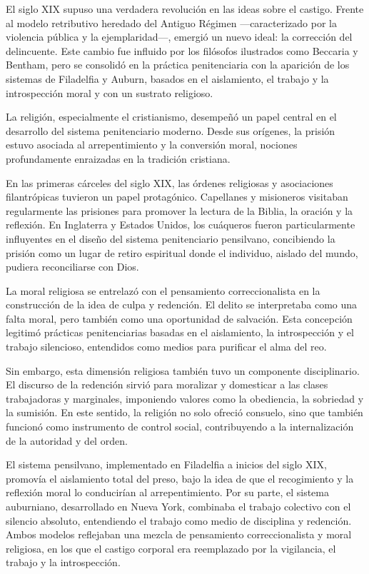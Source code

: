 \documentclass[
  spanish,
  letterpaper,
  DIV=11,
  numbers=noendperiod]{scrreprt}
\begin{document}
El siglo XIX supuso una verdadera revolución en las ideas sobre el
castigo. Frente al modelo retributivo heredado del Antiguo Régimen
---caracterizado por la violencia pública y la ejemplaridad---, emergió
un nuevo ideal: la corrección del delincuente. Este cambio fue influido
por los filósofos ilustrados como Beccaria y Bentham, pero se consolidó
en la práctica penitenciaria con la aparición de los sistemas de
Filadelfia y Auburn, basados en el aislamiento, el trabajo y la
introspección moral y con un sustrato religioso.

La religión, especialmente el cristianismo, desempeñó un papel central
en el desarrollo del sistema penitenciario moderno. Desde sus orígenes,
la prisión estuvo asociada al arrepentimiento y la conversión moral,
nociones profundamente enraizadas en la tradición cristiana.

En las primeras cárceles del siglo XIX, las órdenes religiosas y
asociaciones filantrópicas tuvieron un papel protagónico. Capellanes y
misioneros visitaban regularmente las prisiones para promover la lectura
de la Biblia, la oración y la reflexión. En Inglaterra y Estados Unidos,
los cuáqueros fueron particularmente influyentes en el diseño del
sistema penitenciario pensilvano, concibiendo la prisión como un lugar
de retiro espiritual donde el individuo, aislado del mundo, pudiera
reconciliarse con Dios.

La moral religiosa se entrelazó con el pensamiento correccionalista en
la construcción de la idea de culpa y redención. El delito se
interpretaba como una falta moral, pero también como una oportunidad de
salvación. Esta concepción legitimó prácticas penitenciarias basadas en
el aislamiento, la introspección y el trabajo silencioso, entendidos
como medios para purificar el alma del reo.

Sin embargo, esta dimensión religiosa también tuvo un componente
disciplinario. El discurso de la redención sirvió para moralizar y
domesticar a las clases trabajadoras y marginales, imponiendo valores
como la obediencia, la sobriedad y la sumisión. En este sentido, la
religión no solo ofreció consuelo, sino que también funcionó como
instrumento de control social, contribuyendo a la internalización de la
autoridad y del orden.

El sistema pensilvano, implementado en Filadelfia a inicios del siglo
XIX, promovía el aislamiento total del preso, bajo la idea de que el
recogimiento y la reflexión moral lo conducirían al arrepentimiento. Por
su parte, el sistema auburniano, desarrollado en Nueva York, combinaba
el trabajo colectivo con el silencio absoluto, entendiendo el trabajo
como medio de disciplina y redención. Ambos modelos reflejaban una
mezcla de pensamiento correccionalista y moral religiosa, en los que el
castigo corporal era reemplazado por la vigilancia, el trabajo y la
introspección.
\end{document}
